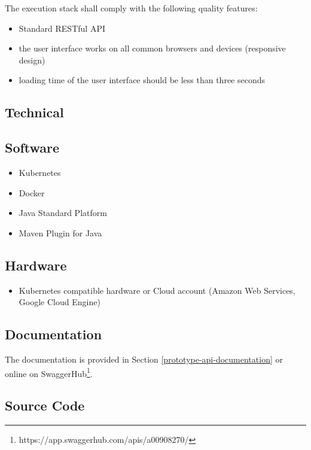 The execution stack shall comply with the following quality features:

\begin{itemize}
\tightlist
\item
  Standard RESTful API
\item
  the user interface works on all common browsers and devices
  (responsive design)
\item
  loading time of the user interface should be less than three seconds
\end{itemize}

\subsection{Technical}\label{technical}

\subsection{Software}\label{software}

\begin{itemize}
\tightlist
\item
  Kubernetes
\item
  Docker
\item
  Java Standard Platform
\item
  Maven Plugin for Java
\end{itemize}

\subsection{Hardware}\label{hardware}

\begin{itemize}
\tightlist
\item
  Kubernetes compatible hardware or Cloud account (Amazon Web Services,
  Google Cloud Engine)
\end{itemize}

\subsection{Documentation}\label{documentation}

The documentation is provided in Section
\ref{prototype-api-documentation} or online on SwaggerHub\footnote{https://app.swaggerhub.com/apis/a00908270/}.

\subsection{Source Code}\label{source-code}

